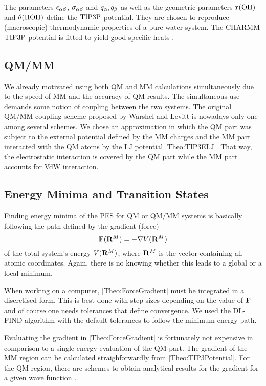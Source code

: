 \documentclass[8.5pt,twoside,twocolumn]{article}
\renewcommand\r{\bo r}
\theoremstyle{standard}
\begin{document}
The parameters $\epsilon_{\alpha\beta}$, $\sigma_{\alpha\beta}$ and $q_{\alpha}, q_{\beta}$ as well as the geometric parameters
$\r(\te{OH})$ and $\theta(\text{HOH})$ define the $\text{TIP3P}$ potential. They are chosen to reproduce
(macroscopic) thermodynamic properties of a pure water system.
The CHARMM $\text{TIP3P}$
potential is fitted to yield good specific heats \cite{MacKerell1998CHARMMTIP3}.  

\subsection{QM/MM}
\label{Sec:Theo:QMMM}

We already motivated using both QM and MM calculations simultaneously due to
the speed of MM and the accuracy of QM results. The simultaneous use
demands some notion of coupling between the two systems. The original
QM/MM coupling scheme proposed by Warshel and Levitt \cite{Warshel1976QMMM}
is nowadays only one among several schemes.
We chose an approximation
in which the QM part was subject to the external potential defined
by the MM charges and the MM part interacted with the QM atoms by
the LJ potential \eqref{Theo:TIP3ELJ}. That way, the electrostatic
interaction is covered by the QM part while the MM part accounts for
VdW interaction.

\subsection{Energy Minima and Transition States}
\label{Sec:Theo:Minima}
Finding energy minima of the PES for QM or QM/MM systems is basically following
the path defined by the gradient (force)
\newcommand\RM{\enmat{\bo R^M}}
\begin{equation}
\bo F(\RM)=-\nabla V(\RM)
\label{Theo:ForceGradient}
\end{equation}
of the total system's energy $V(\RM)$, where $\RM$ is the vector containing
all atomic coordinates. Again, there is no knowing whether this leads to
a global or a local minimum.

When working on a computer, \eqref{Theo:ForceGradient} must be integrated
in a discretised form. This is best done with step sizes depending on the
value of $\mathbf{F}$ and of course one needs tolerances that define convergence.
We used the DL-FIND algorithm \cite{Kaestner2009} with the default tolerances
to follow the minimum energy path.

Evaluating the gradient in \eqref{Theo:ForceGradient} is fortunately not
expensive in comparison to a single energy evaluation of the QM part. The gradient of
the MM region can be calculated straighforwardly from \eqref{Theo:TIP3Potential}.
For the QM region, there are schemes to obtain analytical results for the gradient
for a given wave function \cite{Brorsen2014AnalyticalGradientDFT}.
\end{document}
